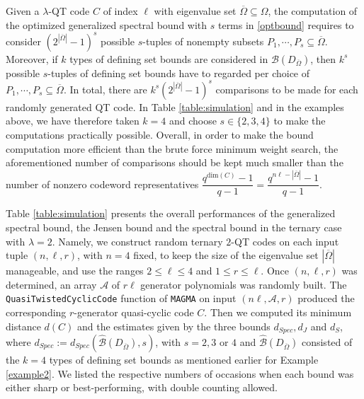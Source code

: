 \documentclass[11pt]{amsart}
\theoremstyle{plain}
\theoremstyle{definition}
\numberwithin{equation}{section}
\begin{document}
Given a $\lambda$-QT code $C$ of index $\ell$ with eigenvalue set $\overline{\Omega}\subseteq\Omega$, the computation of the optimized generalized spectral bound with $s$ terms in \eqref{optbound} requires to consider $(2^{|\overline{\Omega}|}-1)^s$ possible $s$-tuples of nonempty subsets $P_1, \cdots, P_s \subseteq \overline{\Omega}$. Moreover, if $k$ types of defining set bounds are considered in $\mathcal{B}(D_{\overline{\Omega}})$, then $k^s$ possible $s$-tuples of defining set bounds have to regarded per choice of $P_1, \cdots, P_s \subseteq \overline{\Omega}$. In total, there are $k^s \left(2^{|\overline{\Omega}|}-1\right)^s$ comparisons to be made for each randomly generated QT code. In Table \ref{table:simulation} and in the examples above, we have therefore taken $k=4$ and choose $s \in \{2,3,4\}$ to make the computations practically possible. Overall, in order to make the bound computation more efficient than the brute force minimum weight search, the aforementioned number of comparisons should be kept much smaller than the number of nonzero codeword representatives $\dfrac{q^{\text{dim}(C)}-1}{q-1}=\dfrac{q^{n\ell - |\overline{\Omega}|}-1}{q-1}$.

Table \ref{table:simulation} presents the overall performances of the generalized spectral bound, the Jensen bound and the spectral bound in the ternary case with $\lambda=2$. Namely, we construct random ternary $2$-QT codes on each input tuple $(n,\ell,r)$, with $n = 4$ fixed, to keep the size of the eigenvalue set $|\overline{\Omega}|$ manageable, and use the ranges $2 \leq \ell \leq 4$ and $1 \leq r \leq \ell$. Once $(n,\ell,r)$ was determined, an array $\mathcal{A}$ of $r \ell$ generator polynomials was randomly built. The {\tt QuasiTwistedCyclicCode} function of \texttt{MAGMA} on input $(n \ell, \mathcal{A}, r)$ produced the corresponding $r$-generator quasi-cyclic code $C$. Then we computed its minimum distance $d(C)$ and the estimates given by the three bounds $d_{Spec}, d_J$ and $d_{S}$, where $d_{Spec} :=d_{Spec}(\widehat{\mathcal{B}}(D_{\overline{\Omega}}),s)$, with $s=2,3$ or $4$ and $\widehat{\mathcal{B}}(D_{\overline{\Omega}})$ consisted of the $k=4$ types of defining set bounds as mentioned earlier for Example \ref{example2}. We listed the respective numbers of occasions when each bound was either sharp or best-performing, with double counting allowed.
\end{document}
